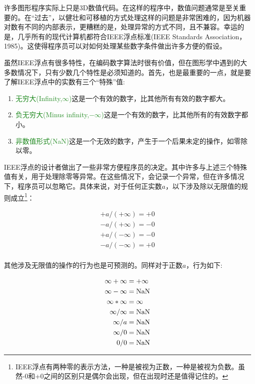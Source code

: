 许多图形程序实际上只是3D数值代码。在这样的程序中，数值问题通常是至关重要的。在“过去”，以健壮和可移植的方式处理这样的问题是非常困难的，因为机器对数有不同的内部表示，更糟糕的是，处理异常的方式不同，且不兼容。幸运的是，几乎所有的现代计算机都符合IEEE浮点标准(IEEE Standards Association，1985)。这使得程序员可以对如何处理某些数字条件做出许多方便的假设。

虽然IEEE浮点有很多特性，在编码数字算法时很有价值，但在图形学中遇到的大多数情况下，只有少数几个特性是必须知道的。首先，也是最重要的一点，就是要了解IEEE浮点中的实数有三个“特殊”值:

\begin{enumerate}
	\item \textcolor{ForestGreen}{无穷大(Infinity,$\infty$)}这是一个有效的数字，比其他所有有效的数字都大。
	
	\item \textcolor{ForestGreen}{负无穷大(Minus infinity,$-\infty$)}这是一个有效的数字，比其他所有的有效数字都小。
	
	\item \textcolor{ForestGreen}{非数值形式(NaN)}这是一个无效的数字，产生于一个后果未定的操作，如零除以零。
\end{enumerate}


IEEE浮点的设计者做出了一些非常方便程序员的决定。其中许多与上述三个特殊值有关，用于处理除零等异常。在这些情况下，会记录一个异常，但在许多情况下，程序员可以忽略它。具体来说，对于任何正实数$a$，以下涉及除以无限值的规则成立\footnote{IEEE浮点有两种零的表示方法，一种是被视为正数，一种是被视为负数。虽然-0和+0之间的区别只是偶尔会出现，但在出现时还是值得记住的。}：


\begin{equation}
	\begin{aligned}	
		+a/(+\infty)=+0 \\
		-a/(+\infty)=-0 \\
		+a/(-\infty)=-0 \\
		-a/(-\infty)=+0 \\
	\end{aligned}
	\nonumber	
\end{equation}

其他涉及无限值的操作的行为也是可预测的。同样对于正数$a$，行为如下:

\begin{equation}
	\begin{aligned}	
		\infty+\infty&=+\infty\\
		\infty-\infty&= \rm NaN\\
		\infty*\infty&=\infty\\
		\infty/\infty&= \rm NaN \\
		\infty/a&=\rm NaN \\
		\infty/0&=\rm NaN \\
		0/0&=\rm NaN \\
	\end{aligned}
	\nonumber	
\end{equation}

